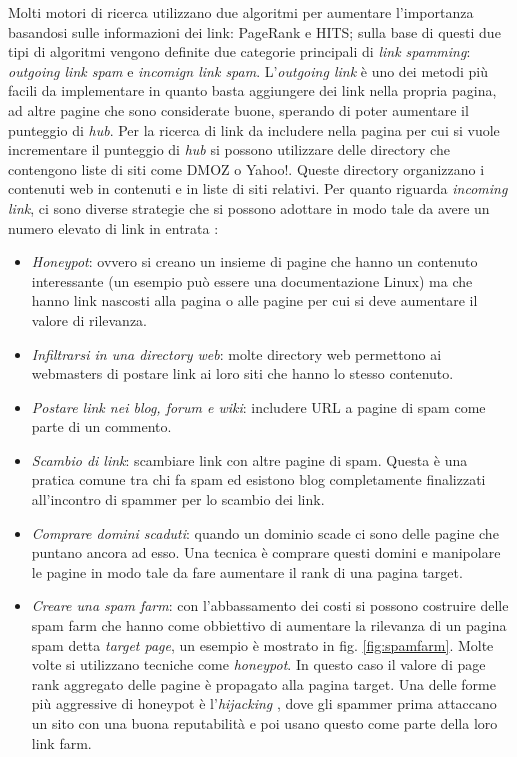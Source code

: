 Molti motori di ricerca utilizzano due algoritmi per aumentare l'importanza basandosi sulle informazioni dei link: PageRank e HITS; sulla base di questi due tipi di algoritmi vengono definite due categorie principali di \textit{link spamming}: \textit{outgoing link spam} e \textit{incomign link spam}. L'\textit{outgoing link} è uno dei metodi più facili da implementare in quanto basta aggiungere dei link nella propria pagina, ad altre pagine che sono considerate buone, sperando di poter aumentare il  punteggio di \textit{hub}. Per la ricerca di link da includere nella pagina per cui si vuole incrementare il punteggio di \textit{hub} si possono utilizzare delle directory che contengono liste di siti come DMOZ o Yahoo!. Queste directory organizzano i contenuti web in contenuti e in liste di siti relativi. Per quanto riguarda \textit{incoming link}, ci sono diverse strategie che si possono adottare in modo tale da avere un numero elevato di link in entrata \cite{ilprints646}:
\begin{itemize}
\item \textit{Honeypot}: ovvero si creano un insieme di pagine che hanno un contenuto interessante (un esempio può essere una documentazione Linux) ma che hanno link nascosti alla pagina o alle pagine per cui si deve aumentare il valore di rilevanza.  
\item \textit{Infiltrarsi in una directory web}: molte directory web permettono ai webmasters di postare link ai loro siti che hanno lo stesso contenuto.
\item \textit{Postare link nei blog, forum e wiki}: includere URL a pagine di spam come parte di un commento.
\item \textit{Scambio di link}: scambiare link con altre pagine di spam. Questa è una pratica comune tra chi fa spam ed esistono blog completamente finalizzati all'incontro di spammer per lo scambio dei link.
\item \textit{Comprare domini scaduti}: quando un dominio scade ci sono delle pagine che puntano ancora ad esso. Una tecnica è comprare questi domini e manipolare le pagine in modo tale da fare aumentare il rank di una pagina target.
\item \textit{Creare una spam farm}: con l'abbassamento dei costi si possono costruire delle spam farm che hanno come obbiettivo di aumentare la rilevanza di un pagina spam detta \textit{target page}, un esempio è mostrato in fig. \ref{fig:spamfarm}. Molte volte si utilizzano tecniche come \textit{honeypot}. In questo caso il valore di page rank aggregato delle pagine è propagato alla pagina target. Una delle forme più aggressive di honeypot è l'\textit{hijacking} \cite{Spirin:2012:SWS:2207243.2207252}, dove gli spammer prima attaccano un sito con una buona reputabilità e poi usano questo come parte della loro link farm.
\end{itemize}
